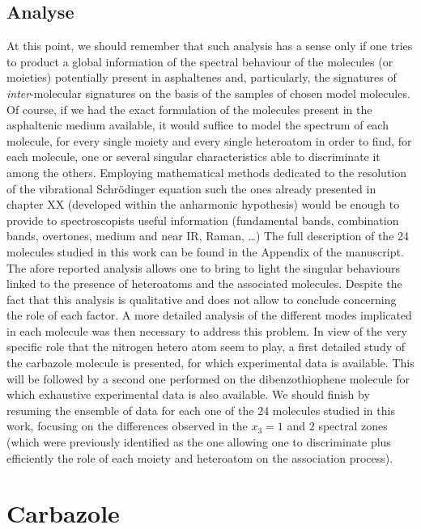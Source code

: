 \subsection{Analyse}

At this point, we should remember that such analysis has a sense only if one tries to product a global information of the spectral behaviour of the molecules (or moieties) potentially present in asphaltenes and, particularly, the signatures of \textit{inter}-molecular signatures on the basis of the samples of chosen model molecules. Of course, if we had the exact formulation of the molecules present in the asphaltenic medium available, it would suffice to model the spectrum of each molecule, for every single moiety and every single heteroatom in order to find, for each molecule, one or several singular characteristics able to discriminate it among the others. Employing mathematical methods dedicated to the resolution of the vibrational Schr\"{o}dinger equation such the ones already presented in chapter XX (developed within the anharmonic hypothesis) would be enough to provide to spectroscopists useful information (fundamental bands, combination bands, overtones, medium and near IR, Raman, …) The full description of the 24 molecules studied in this work can be found in the Appendix of the manuscript.\\  

The afore reported analysis allows one to bring to light the singular behaviours linked to the presence of heteroatoms and the associated molecules. Despite the fact that this analysis is qualitative and does not allow to conclude concerning the role of each factor. A more detailed analysis of the different modes implicated in each molecule was then necessary to address this problem. In view of the very specific role that the nitrogen hetero atom seem to play, a first detailed study of the carbazole molecule is presented, for which experimental data is available. This will be followed by a second one performed on the dibenzothiophene molecule for which exhaustive experimental data is also available. We should finish by resuming the ensemble of data for each one of the 24 molecules studied in this work, focusing on the differences observed in the $x_3=1$ and $2$ spectral zones (which were previously identified as the one allowing one to discriminate plus efficiently the role of each moiety and heteroatom on the association process).	

\section{Carbazole}

